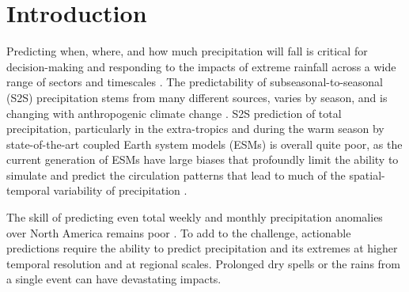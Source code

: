 \documentclass{ametsocV6.1}
\begin{document}




\section{Introduction}
\label{sec:intro}

Predicting when, where, and how much precipitation will fall is critical for decision-making and responding to the impacts of extreme rainfall across a wide range of sectors and timescales \citep{DOE:2020}. The predictability of subseasonal-to-seasonal (S2S) precipitation stems from many different sources, varies by season, and is changing with anthropogenic climate change \citep{DOE:2020}. S2S prediction of total precipitation, particularly in the extra-tropics and during the warm season by state-of-the-art coupled Earth system models (ESMs) is overall quite poor, as the current generation of ESMs have large biases that profoundly limit the ability to simulate and predict the circulation patterns that lead to much of the spatial-temporal variability of precipitation \citep{DOE:2020}. 

The skill of predicting even total weekly and monthly precipitation anomalies over North America remains poor \citep[e.g.,][]{pegion_subseasonal_2019,becker_evolution_2020}. To add to the challenge, actionable predictions require the ability to predict precipitation and its extremes at higher temporal resolution and at regional scales. Prolonged dry spells or the rains from a single event can have devastating impacts.   
\end{document}
